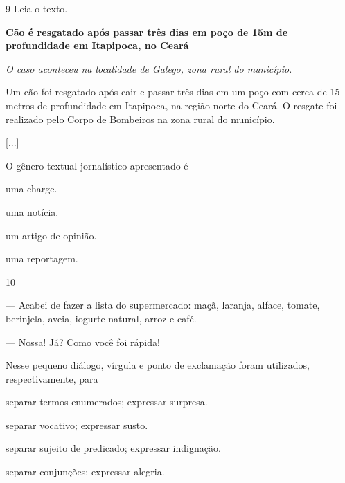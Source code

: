 \num{9} Leia o texto.

\begin{myquote}
\textbf{Cão é resgatado após passar três dias em poço de 15m de profundidade em Itapipoca, no Ceará}

\emph{O caso aconteceu na localidade de Galego, zona rural do município.}

Um cão foi resgatado após cair e passar três dias em um poço com cerca
de 15 metros de profundidade em
Itapipoca, na
região norte do Ceará. O resgate foi realizado pelo Corpo de Bombeiros
na zona rural do município.

{[}...{]}

\end{myquote}

O gênero textual jornalístico apresentado é

\begin{escolha}
\item uma charge.

\item uma notícia.

\item um artigo de opinião.

\item uma reportagem.
\end{escolha}

\num{10}

\begin{myquote}
--- Acabei de fazer a lista do supermercado: maçã, laranja, alface,
tomate, berinjela, aveia, iogurte natural, arroz e café.

--- Nossa! Já? Como você foi rápida!
\end{myquote}

Nesse pequeno diálogo, vírgula e ponto de exclamação foram utilizados,
respectivamente, para

\begin{escolha}
\item separar termos enumerados; expressar surpresa.

\item separar vocativo; expressar susto.

\item separar sujeito de predicado; expressar indignação.

\item separar conjunções; expressar alegria.
\end{escolha}

